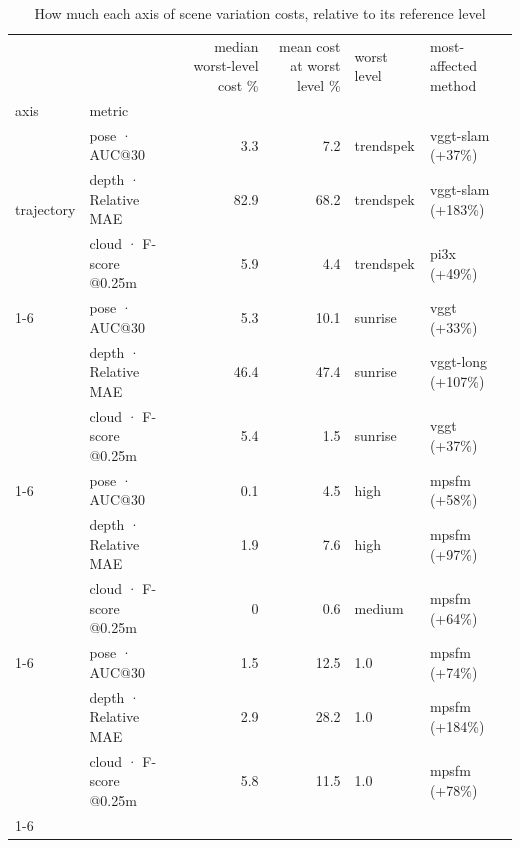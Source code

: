 \begin{table}
\caption{How much each axis of scene variation costs, relative to its reference level}
\label{tab:t4_axis_sensitivity}
\begin{tabular}{llrrll}
\toprule
 &  & median worst-level cost \% & mean cost at worst level \% & worst level & most-affected method \\
axis & metric &  &  &  &  \\
\midrule
\multirow[t]{3}{*}{trajectory} & pose · AUC@30 & 3.3 & 7.2 & trendspek & vggt-slam (+37\%) \\
 & depth · Relative MAE & 82.9 & 68.2 & trendspek & vggt-slam (+183\%) \\
 & cloud · F-score @0.25m & 5.9 & 4.4 & trendspek & pi3x (+49\%) \\
\cline{1-6}
\multirow[t]{3}{*}{illumination} & pose · AUC@30 & 5.3 & 10.1 & sunrise & vggt (+33\%) \\
 & depth · Relative MAE & 46.4 & 47.4 & sunrise & vggt-long (+107\%) \\
 & cloud · F-score @0.25m & 5.4 & 1.5 & sunrise & vggt (+37\%) \\
\cline{1-6}
\multirow[t]{3}{*}{soiling} & pose · AUC@30 & 0.1 & 4.5 & high & mpsfm (+58\%) \\
 & depth · Relative MAE & 1.9 & 7.6 & high & mpsfm (+97\%) \\
 & cloud · F-score @0.25m & 0 & 0.6 & medium & mpsfm (+64\%) \\
\cline{1-6}
\multirow[t]{3}{*}{reflectivity} & pose · AUC@30 & 1.5 & 12.5 & 1.0 & mpsfm (+74\%) \\
 & depth · Relative MAE & 2.9 & 28.2 & 1.0 & mpsfm (+184\%) \\
 & cloud · F-score @0.25m & 5.8 & 11.5 & 1.0 & mpsfm (+78\%) \\
\cline{1-6}
\bottomrule
\end{tabular}
\end{table}


